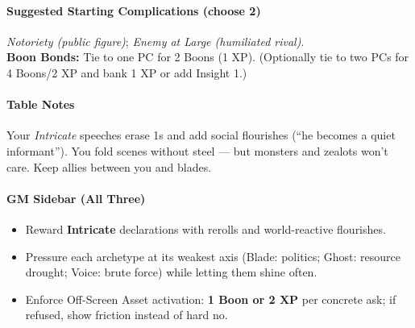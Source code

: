 \documentclass[11pt]{book}
\begin{document}
\paragraph{Suggested Starting Complications (choose 2)}
\emph{Notoriety (public figure)}; \emph{Enemy at Large (humiliated rival)}.\\
\textbf{Boon Bonds:} Tie to one PC for 2 Boons (1 XP). (Optionally tie to two PCs for 4 Boons/2 XP and bank 1 XP or add Insight 1.)

\paragraph{Table Notes}
Your \emph{Intricate} speeches erase 1s and add social flourishes (“he becomes a quiet informant”). You fold scenes without steel — but monsters and zealots won’t care. Keep allies between you and blades.

\bigskip

\paragraph{GM Sidebar (All Three)}
\begin{itemize}
  \item Reward \textbf{Intricate} declarations with rerolls and world-reactive flourishes.
  \item Pressure each archetype at its weakest axis (Blade: politics; Ghost: resource drought; Voice: brute force) while letting them shine often.
  \item Enforce Off-Screen Asset activation: \textbf{1 Boon or 2 XP} per concrete ask; if refused, show friction instead of hard no.
\end{itemize}
\end{document}
